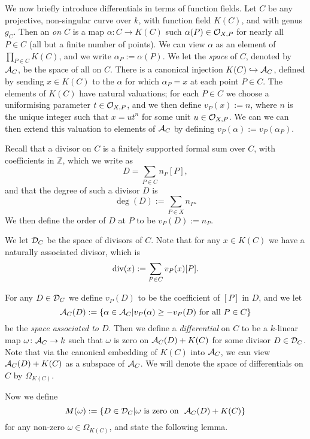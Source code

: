 We now briefly introduce differentials in terms of function fields.
Let $C$ be any projective, non-singular curve over $k$, with function field $K(C)$, and with genus $g_C$.
Then an {\em \adele on $C$} is a map $\alpha\colon  C \rightarrow K(C)$ such $\alpha(P) \in {\cal O}_{X,P}$ for nearly all $P \in C$ (\ie all but a finite number of points).
We can view $\alpha$ as an element of $\prod_{P\in C}K(C)$, and we write $\alpha_P := \alpha(P)$.
We let the {\em \adele space} of $C$, denoted by ${\mathcal A}_C$, be the space of all \adeles on $C$.
There is a canonical injection $K(C) \hookrightarrow  {\mathcal A}_C$, defined by sending $x\in K(C)$ to the \adele $\alpha$ for which $\alpha_P =  x$ at each point $P\in C$.
The elements of $K(C)$ have natural valuations; for each $P\in C$ we choose a uniformising parameter $t\in {\cal O}_{X,P}$, and we then define $v_P(x):=n$, where $n$ is the unique integer such that $x=ut^n$ for some unit $u\in {\cal O}_{X,P}$.
We can we can then extend this valuation to elements of ${\mathcal A}_C$ by defining $v_P(\alpha) := v_P(\alpha_P)$.

Recall that a divisor on $C$ is a finitely supported formal sum over $C$, with coefficients in $\mathbb Z$, which we write as 
    \[
    D = \sum_{P\in C} n_P [P],
    \]
and that the degree of such a divisor $D$ is 
    \[
    \deg(D) := \sum_{P\in X} n_P.
    \]
We then define the order of $D$ at $P$ to be $v_P(D) := n_P$.

We let ${\mathcal D}_C$ be the space of divisors of $C$.
Note that for any $x\in K(C)$ we have a naturally associated divisor, which is
    \[
    \operatorname{div}(x) := \sum_{P\in C} v_P(x) [P].
    \]

For any $D\in {\mathcal D}_C$ we define $v_P(D)$ to be the coefficient of $[P]$ in $D$, and we let
    \[
    {\mathcal A}_C(D):=\{\alpha \in {\mathcal A}_C | v_P(\alpha) \geq -v_P(D)\ \text{for all} \ P\in C\}
    \]
be the {\em \adele space associated to $D$}.
Then we define a {\em differential} on $C$ to be a $k$-linear map $\omega\colon  {\mathcal A}_C \rightarrow k$ such that $\omega$ is zero on ${\mathcal A}_C(D) +K(C)$ for some divisor $D\in {\mathcal D}_C$.
Note that via the canonical embedding of $K(C)$ into ${\mathcal A}_C$, we can view ${\mathcal A}_C(D) +K(C)$ as a subspace of ${\mathcal A}_C$.
We will denote the space of differentials on $C$ by $\Omega_{K(C)}$.

Now we define 
    \[
    M(\omega) := \{ D\in {\mathcal D}_C | \omega \ \text{is zero on }\ {\mathcal A}_C(D) + K(C)\}
    \]
for any non-zero $\omega \in \Omega_{K(C)}$, and state the following lemma.

